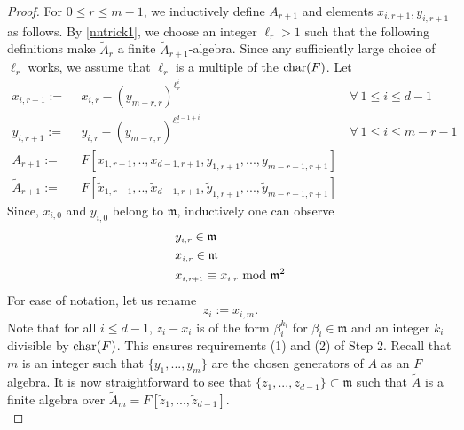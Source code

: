 \documentclass[10pt]{amsart}
\theoremstyle{plain}
\theoremstyle{definition}
\newcommand{\Char}{{\rm char}}
\renewcommand{\tilde}{\widetilde}
\newcommand{\scr}{\scriptscriptstyle}
\begin{document}
\begin{proof}
  For $0 \leq r \leq m-1$, we inductively define $A_{\scr r+1}$ and elements $x_{\scr i,r+1}, y_{\scr i, r+1}$ as follows. By \ref{nntrick1}, we choose an integer $\ell_{\scr r}>1$ such that the following definitions make $\tilde{A}_{\scr r}$ a finite $\tilde{A}_{\scr r+1}$-algebra. Since any sufficiently large choice of $\ell_r$ works, we assume that $\ell_r$ is a multiple of the $\Char(F)$. Let
\begin{align*}
 x_{\scr i,r+1}:= & \ \  x_{\scr i,r}-(y_{\scr m-r,r})^{\ell_{\scr r}^i} & \ \forall \ 1\leq i \leq d-1\\
y_{\scr i,r+1}:= & \ \  y_{\scr i,r}-(y_{\scr m-r,r})^{\ell_{\scr r}^{d-1+i}} & \   \forall \ 1\leq i \leq m-r-1 \\
A_{\scr r+1} := & \ \   F[x_{\scr 1,r+1},..,x_{\scr d-1,r+1},y_{\scr 1,r+1},...,y_{\scr m-r-1,r+1}] \\
\tilde{A}_{\scr r+1} := & \ \   F[\tilde{x}_{\scr 1,r+1},..,\tilde{x}_{\scr d-1,r+1},\tilde{y}_{\scr 1,r+1},...,\tilde{y}_{\scr m-r-1,r+1}]
 \end{align*}
Since, $x_{\scr i,0}$ and $y_{\scr i,0}$ belong to $ \mathfrak{m}$, inductively one can observe 
\begin{align*}
& y_{\scr i,r} \in \mathfrak{m} \\
& x_{\scr i,r} \in \mathfrak{m} \\
& x_{\scr i,r+1} \equiv  x_{\scr i,r} \ {\rm mod} \ \mathfrak{m}^2  
\end{align*}
For ease of notation, let us rename 
$$ z_{\scr i}:= x_{\scr i,m}.$$
Note that for all $i\leq d-1$, $ z_i- x_i$ is of the form $\beta_i^{k_i}$ for  $\beta_i\in \mathfrak{m}$ and an integer $k_i$ divisible by $\Char(F)$. This ensures requirements (1) and (2) of Step 2.
Recall that $m$ is an integer such that $\{y_1,...,y_m\}$ are the chosen generators of $A$ as an $F$ algebra. 
It is now straightforward to see that $\{z_{\scr 1},...,z_{\scr d-1}\}\subset \mathfrak{m}$ such that  $\tilde{A}$ is a finite algebra over $\tilde{A}_{\scr m}=F[\tilde{z}_{\scr 1},...,\tilde{z}_{\scr d-1}]$.  \\



\end{proof}
\end{document}
